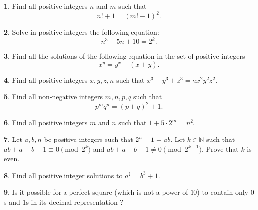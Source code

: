 \documentclass{article}
\theoremstyle{definition}
\newtheorem{p}{}
\begin{document}
	
	
	
	\begin{p}
		Find all positive integers $n$ and $m$ such that \[n!+1 = (m!-1)^{2}.\] 
	\end{p}
	
	
	
	
	\begin{p}
		Solve in positive integers the following equation: \[n^{3}-5n+10=2^{k}.\]
	\end{p}
	
	
	
	
	\begin{p}
		Find all the solutions of the following equation in the set of positive integers 
		\[x^{y}=y^{x}-(x+y).\]
	\end{p}
	
	
	
	
	\begin{p}
		Find all positive integers $x,y,z,n$ such that $x^3+y^3+z^3=nx^2y^2z^2$.
	\end{p}
	
	
	
	
	\begin{p}
		Find all non-negative integers $m,n,p,q$ such that \[ p^mq^n = (p+q)^2 +1 . \]
	\end{p}
	
	
	
	
	\begin{p}
		Find all positive integers $m$ and $n$ such that $1 + 5 \cdot 2^m = n^2$.
	\end{p}
	
	
	
	\begin{p}
		Let $a,b,n$ be positive integers such that $2^n - 1 =ab$. Let $k \in \mathbb N$ such that $ab+a-b-1 \equiv 0 \pmod {2^k}$ and $ab+a-b-1 \neq 0 \pmod {2^{k+1}}$. Prove that $k$ is even.
	\end{p}
	
	
	
	
	\begin{p}
		Find all positive integer solutions to $a^{2}=b^{3}+1$.
	\end{p}
	
	
	
	
	
	
	\begin{p}
		Is it possible for a perfect square (which is not a power of $10$) to contain only $0$s and $1$s in its decimal representation ?
	\end{p}
	
\end{document}
